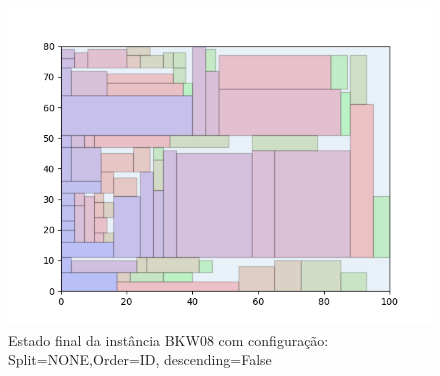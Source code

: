 \begin{figure}[H]
    \centering
    \caption[]{Estado final da instância BKW08 com configuração: Split=NONE,Order=ID, descending=False}
    \label{fig:bkw08-none-id-false}
    \includegraphics[scale=0.5]{output/figures/bkw/bkw08/none/id/false/00}
\end{figure}